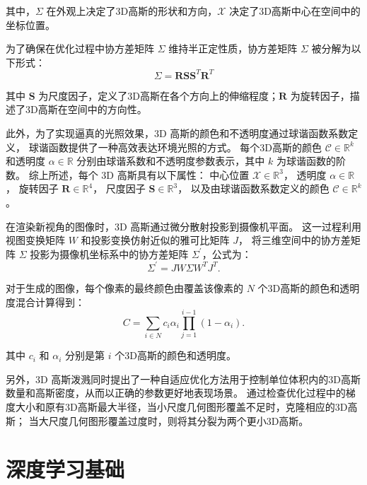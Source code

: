 其中，$\Sigma$ 在外观上决定了3D高斯的形状和方向，$\mathcal{X}$ 决定了3D高斯中心在空间中的坐标位置。

为了确保在优化过程中协方差矩阵 $\Sigma$ 维持半正定性质，协方差矩阵 $\Sigma$ 被分解为以下形式：
\begin{equation}
\label{formula:covariance decomposition}
    \Sigma = \mathbf{R}\mathbf{S}\mathbf{S}^T\mathbf{R}^T
\end{equation}

其中 $\mathbf{S}$ 为尺度因子，定义了3D高斯在各个方向上的伸缩程度；$\mathbf{R}$ 为旋转因子，描述了3D高斯在空间中的方向性。

此外，为了实现逼真的光照效果，3D 高斯的颜色和不透明度通过球谐函数系数定义，
球谐函数提供了一种高效表达环境光照的方式。
每个3D高斯的颜色 $\mathcal{C} \in \mathbb{R}^k$ 和透明度 $\alpha \in \mathbb{R}$ 分别由球谐系数和不透明度参数表示，其中 $k$ 为球谐函数的阶数。
综上所述，每个 3D 高斯具有以下属性：
中心位置 $\mathcal{X} \in \mathbb{R}^3$，
透明度 $\alpha \in \mathbb{R}$，
旋转因子 $\mathbf{R} \in \mathbb{R}^4$，
尺度因子 $\mathbf{S} \in \mathbb{R}^3$，
以及由球谐函数系数定义的颜色 $\mathcal{C} \in \mathbb{R}^k$。

在渲染新视角的图像时，3D 高斯通过微分散射\cite{differential_splatting}投影到摄像机平面。
这一过程利用视图变换矩阵 $W$ 和投影变换仿射近似的雅可比矩阵 $J$，
将三维空间中的协方差矩阵 $\Sigma$ 投影为摄像机坐标系中的协方差矩阵 $\Sigma^{\prime}$，公式为：
\begin{equation}
    \Sigma^{\prime} = JW\Sigma W^TJ^T.
\end{equation} 

对于生成的图像，每个像素的最终颜色由覆盖该像素的 $N$ 个3D高斯的颜色和透明度混合计算得到：
\begin{equation}
\label{formula: splatting&volume rendering}
    C = \sum_{i\in N}c_i \alpha_i \prod_{j=1}^{i-1} (1-\alpha_i).
\end{equation}

其中 $c_i$ 和 $\alpha_i$ 分别是第 $i$ 个3D高斯的颜色和透明度。

另外，3D 高斯泼溅同时提出了一种自适应优化方法用于控制单位体积内的3D高斯数量和高斯密度，从而以正确的参数更好地表现场景。
通过检查优化过程中的梯度大小和原有3D高斯最大半径，当小尺度几何图形覆盖不足时，克隆相应的3D高斯；
当大尺度几何图形覆盖过度时，则将其分裂为两个更小3D高斯。

\section{深度学习基础}
